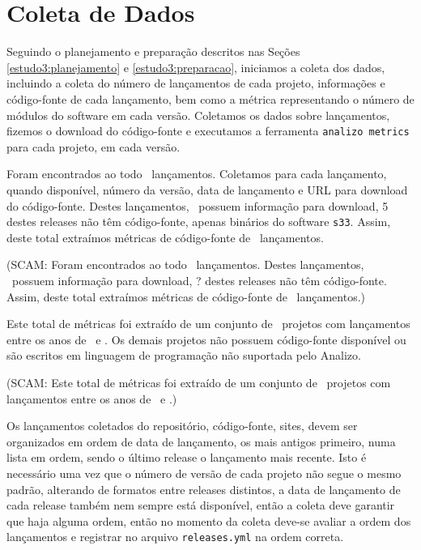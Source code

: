 
\section{Coleta de Dados} \label{estudo3:coleta} %

Seguindo o planejamento e preparação descritos nas Seções
\ref{estudo3:planejamento} e \ref{estudo3:preparacao}, iniciamos a coleta dos
dados, incluindo a coleta do número de lançamentos de cada projeto, informações
e código-fonte de cada lançamento, bem como a métrica representando o número de
módulos do software em cada versão. Coletamos os dados sobre lançamentos,
fizemos o download do código-fonte e executamos a ferramenta \texttt{analizo
metrics} para cada projeto, em cada versão.

Foram encontrados ao todo \ReleasesCount \ lançamentos. Coletamos para cada
lançamento, quando disponível, número da versão, data de lançamento e URL para
download do código-fonte. Destes lançamentos, \ReleasesAvailableCount \ possuem
informação para download, 5 destes releases não têm código-fonte, apenas
binários do software \texttt{s33}. Assim, deste total extraímos métricas
de código-fonte de \ReleasesMetricsCount \ lançamentos.

(SCAM: Foram encontrados ao todo \ReleasesSCAMCount \ lançamentos.
Destes lançamentos, \ReleasesAvailableSCAMCount \ possuem
informação para download, ? destes releases não têm código-fonte.
Assim, deste total extraímos métricas
de código-fonte de \ReleasesMetricsSCAMCount \ lançamentos.)

Este total de métricas foi extraído de um conjunto de \ProjectsAnalizedCount \
projetos com lançamentos entre os anos de \ReleasesYearFirst \ e \ReleasesYearLast.
Os demais projetos não possuem código-fonte disponível ou são
escritos em linguagem de programação não suportada pelo Analizo.

(SCAM: Este total de métricas foi extraído de um conjunto de \ProjectsAnalizedSCAMCount \
projetos com lançamentos entre os anos de \ReleasesYearFirstSCAM \ e \ReleasesYearLastSCAM.)

Os lançamentos coletados do repositório, código-fonte, sites, devem ser
organizados em ordem de data de lançamento, os mais antigos primeiro, numa
lista em ordem, sendo o último release o lançamento mais recente. Isto é
necessário uma vez que o número de versão de cada projeto não segue o mesmo
padrão, alterando de formatos entre releases distintos, a data de lançamento de
cada release também nem sempre está disponível, então a coleta deve garantir
que haja alguma ordem, então no momento da coleta deve-se avaliar a ordem dos
lançamentos e registrar no arquivo \texttt{releases.yml} na ordem correta.

